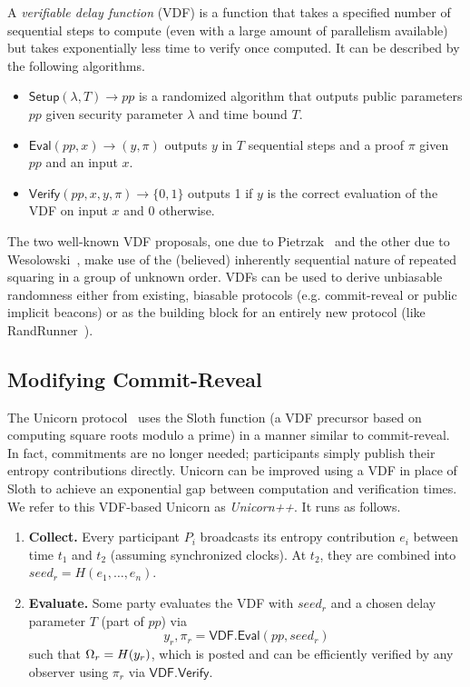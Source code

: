 \begin{definition}
A \textit{verifiable delay function} (VDF) is a function that takes a specified number of sequential steps to compute (even with a large amount of parallelism available) but takes exponentially less time to verify once computed. It can be described by the following algorithms.
\begin{itemize}
\item $\mathsf{Setup}(\lambda, T) \rightarrow pp$ is a randomized algorithm that outputs public parameters $pp$ given security parameter $\lambda$ and time bound $T$.
\item $\mathsf{Eval}(pp, x) \rightarrow (y, \pi)$ outputs $y$ in $T$ sequential steps and a proof $\pi$ given $pp$ and an input $x$.
\item $\mathsf{Verify}(pp, x, y, \pi) \rightarrow \{0, 1\}$ outputs 1 if $y$ is the correct evaluation of the VDF on input $x$ and 0 otherwise.
\end{itemize}
\end{definition}

The two well-known VDF proposals, one due to Pietrzak~\cite{pietrzak2018simple} and the other due to Wesolowski~\cite{wesolowski2019efficient}, make use of the (believed) inherently sequential nature of repeated squaring in a group of unknown order.
VDFs can be used to derive unbiasable randomness either from existing, biasable protocols (e.g. commit-reveal or public implicit beacons) or as the building block for an entirely new protocol (like RandRunner~\cite{schindler2021randrunner}).

\subsection{Modifying Commit-Reveal}
\label{subsection:modifying-commit-reveal}
The Unicorn protocol~\cite{lenstra2015random} uses the Sloth function (a VDF precursor based on computing square roots modulo a prime) in a manner similar to commit-reveal. In fact, commitments are no longer needed; participants simply publish their entropy contributions directly. Unicorn can be improved using a VDF in place of Sloth to achieve an exponential gap between computation and verification times. We refer to this VDF-based Unicorn as \textit{Unicorn++}. It runs as follows.
\begin{enumerate}
    \item \textbf{Collect.} Every participant $P_i$ broadcasts its entropy contribution $e_i$ between time $t_1$ and $t_2$ (assuming synchronized clocks). At $t_2$, they are combined into $seed_r = H(e_1,\ldots, e_n)$.
    \item \textbf{Evaluate.} Some party evaluates the VDF with $seed_r$ and a chosen delay parameter $T$ (part of $pp$) via
    $$y_r, \pi_r = \mathsf{VDF.Eval}(pp, seed_r)$$
    such that $\Omega_r = H(y_r)$, which is posted and can be efficiently verified by any observer using $\pi_r$ via $\mathsf{VDF.Verify}$.
\end{enumerate}

